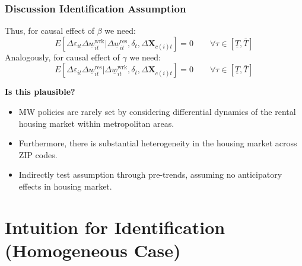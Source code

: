 \documentclass[aspectratio=169, t]{beamer}
\newcommand{\MW}{\underline{w}}
\begin{document}
\begin{frame}
	\frametitle{Discussion Identification Assumption}
	
	Thus, for causal effect of $\beta$ we need:
	$$
	E \left[\Delta \varepsilon_{it} \Delta \MW^{\text{wrk}}_{it}  
	\big| \Delta \MW^{\text{res}}_{it}, \delta_t, \Delta 
	\mathbf{X}_{c(i)t} \right] = 0
	\quad \quad \forall \tau \in \left[ \underline{T}, \overline{T} \right]
	$$
	\vspace{.5mm}
	Analogously, for causal effect of $\gamma$ we need:
	$$
	E \left[\Delta \varepsilon_{it} \Delta \MW^{\text{res}}_{it}  
	\big| \Delta \MW^{\text{wrk}}_{it}, \delta_t, \Delta \mathbf{X}_{c(i)t} 
	\right] = 0
	\quad \quad \forall \tau \in \left[ \underline{T}, \overline{T} \right]
	$$
	
	\pause
	\vspace{.5mm}
	\textbf{Is this plausible?}
	\begin{itemize} \small
		\vspace{.5mm}
		\item MW policies are rarely set by considering differential dynamics of the 
		rental housing market within metropolitan areas.
		
		\vspace{.5mm}
		\item Furthermore, there is substantial heterogeneity in the housing market 
		across ZIP codes.
		
		\vspace{.5mm}
		\item Indirectly test assumption through pre-trends, assuming no anticipatory 
		effects in housing market.
	\end{itemize}
\end{frame}

\section {Intuition for Identification (Homogeneous Case)}
\end{document}
